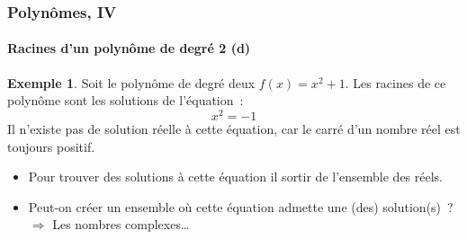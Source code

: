 \documentclass[10pt,notheorems]{beamer}
\theoremstyle{plain}
\theoremstyle{definition} %
\newtheorem{example}{Exemple}
\begin{document}
\begin{frame}
  \frametitle{Polynômes, IV}
  \framesubtitle{Racines d'un polynôme de degré 2 (d)}
  \hypertarget{slide_polynome_2_racines_4}{}

  \bigskip

  \begin{example}
    Soit le polynôme de degré deux $f(x) = x^2+1$. Les racines de ce
    polynôme sont les solutions de l'équation~:
    \[
      x^2 = -1
    \]
    Il n'existe pas de solution réelle à cette équation, car le carré
    d'un nombre réel est toujours positif.
  \end{example}

  \bigskip

  \begin{itemize}

  \item Pour trouver des solutions à cette équation il sortir de l'ensemble des réels.\newline

  \item Peut-on créer un ensemble où cette équation admette une (des) solution(s)~? $\Rightarrow$ Les nombres complexes\ldots

  \end{itemize}

\end{frame}
\end{document}
